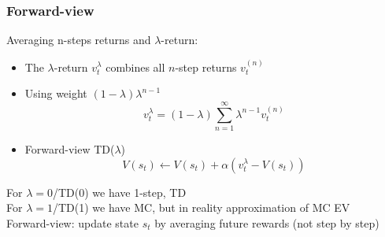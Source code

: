 \subsubsection{Forward-view}
    Averaging n-steps returns and $\lambda$-return:
    \begin{itemize}
        \item The $\lambda$-return $v_t^\lambda$ combines all $n$-step returns $v_t^{(n)}$
        \item Using weight $(1-\lambda)\lambda^{n-1}$
        $$v_t^\lambda =(1-\lambda)\sum_{n=1}^\infty \lambda^{n-1}v_t^{(n)}$$
        \item  Forward-view TD($\lambda$)
        $$V(s_t)\leftarrow V(s_t)+\alpha(v_t^\lambda-V(s_t))$$
    \end{itemize}
    For $\lambda=0$/TD(0) we have 1-step, TD\\
    For $\lambda=1$/TD(1) we have MC, but in reality approximation of MC EV\\
    Forward-view: update state $s_t$ by averaging future rewards (not step by step)
